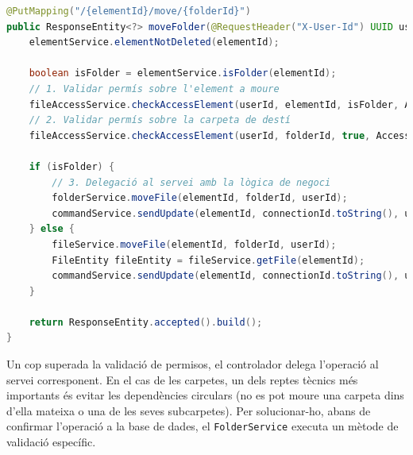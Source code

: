 \begin{lstlisting}[language=Java, caption={Endpoint específic per moure un element a `ElementController`}]
@PutMapping("/{elementId}/move/{folderId}")
public ResponseEntity<?> moveFolder(@RequestHeader("X-User-Id") UUID userId, @RequestHeader("X-Connection-Id") UUID connectionId, @PathVariable("elementId") UUID elementId, @PathVariable("folderId") UUID folderId) {
    elementService.elementNotDeleted(elementId);
    
    boolean isFolder = elementService.isFolder(elementId);
    // 1. Validar permís sobre l'element a moure
    fileAccessService.checkAccessElement(userId, elementId, isFolder, AccessType.WRITE);
    // 2. Validar permís sobre la carpeta de destí
    fileAccessService.checkAccessElement(userId, folderId, true, AccessType.WRITE);

    if (isFolder) {
        // 3. Delegació al servei amb la lògica de negoci
        folderService.moveFile(elementId, folderId, userId);
        commandService.sendUpdate(elementId, connectionId.toString(), userId.toString(), folderService.getFolderByElementId(folderId, false), "", "", "folder");
    } else {
        fileService.moveFile(elementId, folderId, userId);
        FileEntity fileEntity = fileService.getFile(elementId);
        commandService.sendUpdate(elementId, connectionId.toString(), userId.toString(), folderService.getFolderByElementId(folderId, false), fileService.getHash(fileEntity.getId()), fileEntity.getName(), "file");
    }

    return ResponseEntity.accepted().build();
}
\end{lstlisting}

Un cop superada la validació de permisos, el controlador delega l'operació al servei corresponent. En el cas de les carpetes, un dels reptes tècnics més importants és evitar les dependències circulars (no es pot moure una carpeta dins d'ella mateixa o una de les seves subcarpetes). Per solucionar-ho, abans de confirmar l'operació a la base de dades, el \texttt{FolderService} executa un mètode de validació específic.

